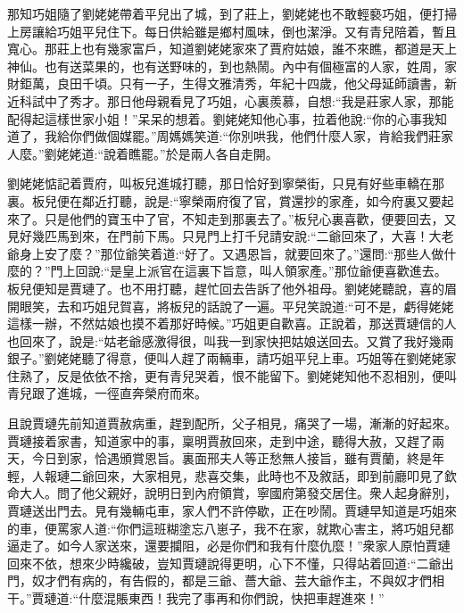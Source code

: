\begin{parag}
    那知巧姐隨了劉姥姥帶着平兒出了城，到了莊上，劉姥姥也不敢輕褻巧姐，便打掃上房讓給巧姐平兒住下。每日供給雖是鄉村風味，倒也潔淨。又有青兒陪着，暫且寬心。那莊上也有幾家富戶，知道劉姥姥家來了賈府姑娘，誰不來瞧，都道是天上神仙。也有送菜果的，也有送野味的，到也熱鬧。內中有個極富的人家，姓周，家財鉅萬，良田千頃。只有一子，生得文雅清秀，年紀十四歲，他父母延師讀書，新近科試中了秀才。那日他母親看見了巧姐，心裏羨慕，自想:“我是莊家人家，那能配得起這樣世家小姐！”呆呆的想着。劉姥姥知他心事，拉着他說:“你的心事我知道了，我給你們做個媒罷。”周媽媽笑道:“你別哄我，他們什麼人家，肯給我們莊家人麼。”劉姥姥道:“說着瞧罷。”於是兩人各自走開。
\end{parag}


\begin{parag}
    劉姥姥惦記着賈府，叫板兒進城打聽，那日恰好到寧榮街，只見有好些車轎在那裏。板兒便在鄰近打聽，說是:“寧榮兩府復了官，賞還抄的家產，如今府裏又要起來了。只是他們的寶玉中了官，不知走到那裏去了。”板兒心裏喜歡，便要回去，又見好幾匹馬到來，在門前下馬。只見門上打千兒請安說:“二爺回來了，大喜！大老爺身上安了麼？”那位爺笑着道:“好了。又遇恩旨，就要回來了。”還問:“那些人做什麼的？”門上回說:“是皇上派官在這裏下旨意，叫人領家產。”那位爺便喜歡進去。板兒便知是賈璉了。也不用打聽，趕忙回去告訴了他外祖母。劉姥姥聽說，喜的眉開眼笑，去和巧姐兒賀喜，將板兒的話說了一遍。平兒笑說道:“可不是，虧得姥姥這樣一辦，不然姑娘也摸不着那好時候。”巧姐更自歡喜。正說着，那送賈璉信的人也回來了，說是:“姑老爺感激得很，叫我一到家快把姑娘送回去。又賞了我好幾兩銀子。”劉姥姥聽了得意，便叫人趕了兩輛車，請巧姐平兒上車。巧姐等在劉姥姥家住熟了，反是依依不捨，更有青兒哭着，恨不能留下。劉姥姥知他不忍相別，便叫青兒跟了進城，一徑直奔榮府而來。
\end{parag}


\begin{parag}
    且說賈璉先前知道賈赦病重，趕到配所，父子相見，痛哭了一場，漸漸的好起來。賈璉接着家書，知道家中的事，稟明賈赦回來，走到中途，聽得大赦，又趕了兩天，今日到家，恰遇頒賞恩旨。裏面邢夫人等正愁無人接旨，雖有賈蘭，終是年輕，人報璉二爺回來，大家相見，悲喜交集，此時也不及敘話，即到前廳叩見了欽命大人。問了他父親好，說明日到內府領賞，寧國府第發交居住。衆人起身辭別，賈璉送出門去。見有幾輛屯車，家人們不許停歇，正在吵鬧。賈璉早知道是巧姐來的車，便罵家人道:“你們這班糊塗忘八崽子，我不在家，就欺心害主，將巧姐兒都逼走了。如今人家送來，還要攔阻，必是你們和我有什麼仇麼！”衆家人原怕賈璉回來不依，想來少時纔破，豈知賈璉說得更明，心下不懂，只得站着回道:“二爺出門，奴才們有病的，有告假的，都是三爺、薔大爺、芸大爺作主，不與奴才們相干。”賈璉道:“什麼混賬東西！我完了事再和你們說，快把車趕進來！”
\end{parag}


